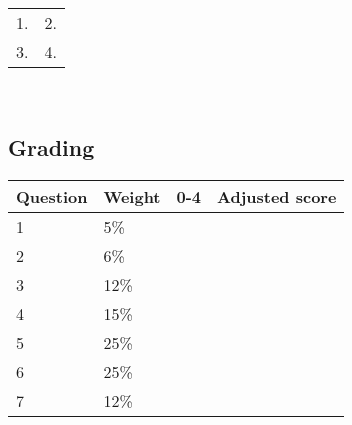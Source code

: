 \documentclass[a4paper,12pt]{book}
\begin{document}
    \begin{tabular}{ p{6cm} p{6cm} }
        1. & 2. \\
        3. & 4.
    \end{tabular}
    ~\\

    \hrulefill
    \subsection*{Grading}
            
    \begin{center}
        
        \begin{tabular}{ | l | l | l | l | }
            \hline
            \textbf{ Question } & \textbf{ Weight } & \textbf{ 0-4 } & \textbf{ Adjusted score }
            \\ \hline
            
            1 & 5\% & &    \\ \hline
            
            2 & 6\% & &    \\ \hline
            
            3 & 12\% & &    \\ \hline
            
            4 & 15\% & &    \\ \hline
            
            5 & 25\% & &    \\ \hline
            
            6 & 25\% & &    \\ \hline
            
            7 & 12\% & &    \\ \hline
            
            
            
        \end{tabular}
    \end{center}
\end{document}
